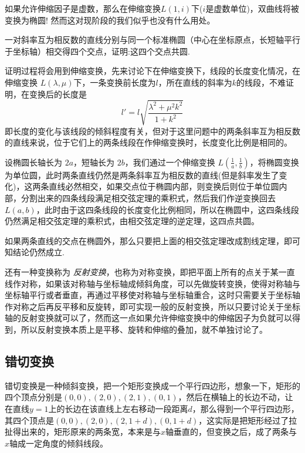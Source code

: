 \begin{example}
  如果允许伸缩因子是虚数，那么在伸缩变换$L(1,i)$下($i$是虚数单位)，双曲线将被变换为椭圆! 然而这对现阶段的我们似乎也没有什么用处。
\end{example}

\begin{example}
  一对斜率互为相反数的直线分别与同一个标准椭圆（中心在坐标原点，长短轴平行于坐标轴）相交得四个交点，证明:这四个交点共圆.

  证明过程将会用到伸缩变换，先来讨论下在伸缩变换下，线段的长度变化情况，在伸缩变换 $L(\lambda,\mu)$下，一条变换前长度为$l$，所在直线的斜率为$k$的线段，不难证明，在变换后的长度是
  \[ l'=l \sqrt{\frac{\lambda^2+\mu^2k^2}{1+k^2}} \]
  即长度的变化与该线段的倾斜程度有关，但对于这里问题中的两条斜率互为相反数的直线来说，位于它们上的两条线段在作伸缩变换时，长度变化比例是相同的。

  设椭圆长轴长为 $2a$，短轴长为 $2b$，我们通过一个伸缩变换 $L\left(\frac{1}{a},\frac{1}{b}\right)$，将椭圆变换为单位圆，此时两条直线仍然是两条斜率互为相反数的直线(但是斜率发生了变化)，这两条直线必然相交，如果交点位于椭圆内部，则变换后则位于单位圆内部，分割出来的四条线段满足相交弦定理的乘积式，然后我们作逆变换回去$L(a,b)$，此时由于这四条线段的长度变化比例相同，所以在椭圆中，这四条线段仍然满足相交弦定理的乘积式，由相交弦定理的逆定理，这四点共圆。

  如果两条直线的交点在椭圆外，那么只要把上面的相交弦定理改成割线定理，即可知结论仍然成立.
\end{example}

还有一种变换称为 \emph{反射变换}，也称为对称变换，即把平面上所有的点关于某一直线作对称，如果该对称轴与坐标轴成倾斜角度，可以先做旋转变换，使得对称轴与坐标轴平行或者垂直，再通过平移使对称轴与坐标轴重合，这时只需要关于坐标轴作对称之后再反平移和反旋转，即可实现一般的反射变换，所以只要讨论关于坐标轴的反射变换就可以了，然而这一点如果允许伸缩变换中的伸缩因子为负就可以得到，所以反射变换本质上是平移、旋转和伸缩的叠加，就不单独讨论了。

\subsection{错切变换}
\label{sec:shear-translation}

错切变换是一种倾斜变换，把一个矩形变换成一个平行四边形，想象一下，矩形的四个顶点分别是$(0,0),(2,0),(2,1),(0,1)$，然后在横轴上的长边不动，让在直线$y=1$上的长边在该直线上左右移动一段距离$d$，那么得到一个平行四边形，其四个顶点是$(0,0),(2,0),(2,1+d),(0,1+d)$，这实际是把矩形经过了拉扯得出来的，矩形原来的两条宽，本来是与$x$轴垂直的，但变换之后，成了两条与$x$轴成一定角度的倾斜线段。

